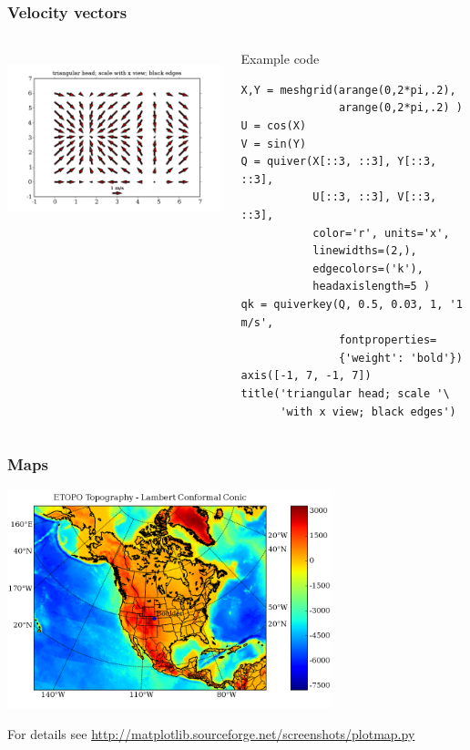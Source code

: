 \documentclass[14pt,compress]{beamer}
\begin{document}
\begin{frame}[fragile] \frametitle{Velocity vectors}
  \begin{columns}
    \hspace*{-0.5in}
  \includegraphics[height=2in, interpolate=true]{data/quiver}  
    \begin{block}{Example code}
    \tiny
\begin{lstlisting}
X,Y = meshgrid(arange(0,2*pi,.2),
               arange(0,2*pi,.2) )
U = cos(X)
V = sin(Y)
Q = quiver(X[::3, ::3], Y[::3, ::3], 
           U[::3, ::3], V[::3, ::3],
           color='r', units='x', 
           linewidths=(2,), 
           edgecolors=('k'), 
           headaxislength=5 )
qk = quiverkey(Q, 0.5, 0.03, 1, '1 m/s', 
               fontproperties=
               {'weight': 'bold'})
axis([-1, 7, -1, 7])
title('triangular head; scale '\
      'with x view; black edges')
\end{lstlisting}
  \end{block}
\end{columns}
\end{frame}

\begin{frame}[fragile] \frametitle{Maps}
  \includegraphics[height=2.5in, interpolate=true]{data/plotmap}  
  \begin{center}
    \tiny
    For details see \url{http://matplotlib.sourceforge.net/screenshots/plotmap.py}
  \end{center}
\end{frame}
\end{document}
